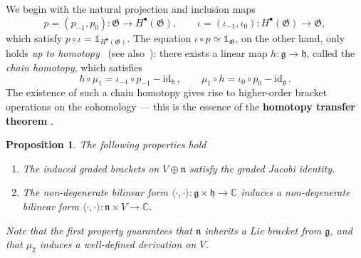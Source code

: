 \documentclass[11pt]{amsart}
\newcommand{\id}{\mathbb{1}}
\newcommand{\C}{{\mathbb C}}
\newcommand{\fg}{\mathfrak{g}}
\newcommand{\fn}{\mathfrak{n}}
\newcommand{\fh}{\mathfrak{h}}
\newcommand{\fG}{\mathfrak{G}}
\numberwithin{equation}{section}
\numberwithin{figure}{section}
\numberwithin{table}{section}
\theoremstyle{thm}
\newtheorem{prop}[theorem]{Proposition}
\numberwithin{equation}{subsection}
\theoremstyle{definition}
\theoremstyle{rem}
\begin{document}
We begin with the natural projection and inclusion maps
\begin{equation*}
    p = (p_{-1}, p_0): \mathfrak{G} \to H^\bullet(\mathfrak{G}), \qquad 
    \iota = (\iota_{-1}, \iota_0): H^\bullet(\mathfrak{G}) \to \mathfrak{G},
\end{equation*}
which satisfy $p\circ\iota=\id_{H^\bullet(\fG)}$. The equation $\iota\circ p \simeq \id_{\fG}$, on the other hand, only holds \textit{up to homotopy}~\cite{Stasheff:1963} (see also~\cite{Alfonsi_2023}): there exists a linear map \( h: \mathfrak{g} \to \mathfrak{h} \), called the \emph{chain homotopy}, which satisfies
\begin{equation}
    h \circ \mu_1 = \iota_{-1} \circ p_{-1} - \mathrm{id}_{\mathfrak{h}}\,, \qquad 
    \mu_1 \circ h = \iota_0 \circ p_0 - \mathrm{id}_{\mathfrak{g}}\,.
\end{equation}
The existence of such a chain homotopy gives rise to higher-order bracket operations on the cohomology ---  this is the essence of the \textbf{homotopy transfer theorem} \cite{Baez:2003fs,stasheff2018,Arvanitakis:2020rrk}.


\begin{prop} 
\label{prop:nisanalgebra}
The following properties hold
    \begin{enumerate}
        \item The induced graded brackets on $V\oplus \fn$ satisfy the graded Jacobi identity.
        \item The non-degenerate bilinear form $\langle \cdot,\cdot\rangle : \fg \times \fh \to \C$ induces a non-degenerate bilinear form $\langle\cdot,\cdot\rangle:\fn \times V \to \C$.
    \end{enumerate}
Note that the first property guarantees that $\fn$ inherits a Lie bracket from $\fg$, and that $\mu_2$ induces a well-defined derivation on $V$.
\end{prop}
\end{document}
